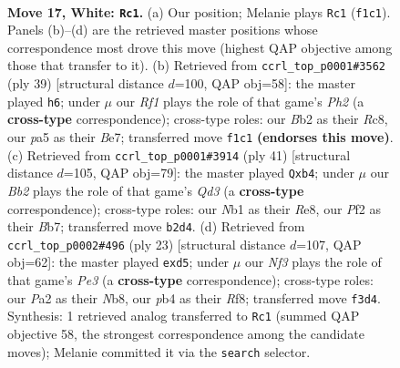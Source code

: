 \documentclass[11pt]{article}
\begin{document}
\clearpage

\begin{figure}[p]\centering
\begin{subfigure}{0.46\textwidth}\centering
\resizebox{\linewidth}{!}{%
\newchessgame
\chessboard[
  setfen={r2q1rk1/4bp2/2n2np1/p6p/1p1p4/1P1P1NP1/PB2QPKP/RN3R2 w - - 2 17},
  showmover=false,
  pgfstyle=straightmove, color=movearrow, markmove={f1-c1}
]}
\caption{}
\end{subfigure}\hfill
\begin{subfigure}{0.46\textwidth}\centering
\resizebox{\linewidth}{!}{%
\newchessgame
\chessboard[
  setfen={r1r3k1/1q2bppp/pp1ppnn1/8/2PNP3/1PN3P1/P2BQP1P/2RR2K1 b - - 4 20},
  showmover=false,
  pgfstyle=straightmove, color=movearrow, markmove={h7-h6}
]}
\caption{}
\end{subfigure}
\\[4pt]
\begin{subfigure}{0.46\textwidth}\centering
\resizebox{\linewidth}{!}{%
\newchessgame
\chessboard[
  setfen={4rr2/1bp3kp/1pnq1ppn/4p3/PP2P3/3P1N1P/1Q2BNP1/R2R2K1 b - - 0 21},
  showmover=false,
  pgfstyle=straightmove, color=movearrow, markmove={d6-b4}
]}
\caption{}
\end{subfigure}\hfill
\begin{subfigure}{0.46\textwidth}\centering
\resizebox{\linewidth}{!}{%
\newchessgame
\chessboard[
  setfen={rn3rk1/pbp1qppp/1p2pn2/3P4/3P4/2NBPN2/PP3PPP/R2Q1RK1 b - - 0 12},
  showmover=false,
  pgfstyle=straightmove, color=movearrow, markmove={e6-d5}
]}
\caption{}
\end{subfigure}
\caption{\textbf{Move 17, White: \texttt{Rc1}.} (a) Our position; Melanie plays \texttt{Rc1} (\texttt{f1c1}). Panels (b)--(d) are the retrieved master positions whose correspondence most drove this move (highest QAP objective among those that transfer to it). (b) Retrieved from \texttt{ccrl\_top\_p0001\#3562} (ply 39) [structural distance $d$=100, QAP obj=58]: the master played \texttt{h6}; under $\mu$ our \emph{Rf1} plays the role of that game's \emph{Ph2} (a \textbf{cross-type} correspondence); cross-type roles: our \emph{B}b2 as their \emph{R}c8, our \emph{p}a5 as their \emph{B}e7; transferred move \texttt{f1c1} \textbf{(endorses this move)}. (c) Retrieved from \texttt{ccrl\_top\_p0001\#3914} (ply 41) [structural distance $d$=105, QAP obj=79]: the master played \texttt{Qxb4}; under $\mu$ our \emph{Bb2} plays the role of that game's \emph{Qd3} (a \textbf{cross-type} correspondence); cross-type roles: our \emph{N}b1 as their \emph{R}e8, our \emph{P}f2 as their \emph{B}b7; transferred move \texttt{b2d4}. (d) Retrieved from \texttt{ccrl\_top\_p0002\#496} (ply 23) [structural distance $d$=107, QAP obj=62]: the master played \texttt{exd5}; under $\mu$ our \emph{Nf3} plays the role of that game's \emph{Pe3} (a \textbf{cross-type} correspondence); cross-type roles: our \emph{P}a2 as their \emph{N}b8, our \emph{p}b4 as their \emph{R}f8; transferred move \texttt{f3d4}. Synthesis: 1 retrieved analog transferred to \texttt{Rc1} (summed QAP objective 58, the strongest correspondence among the candidate moves); Melanie committed it via the \texttt{search} selector.}
\label{fig:thought-m32}
\end{figure}
\end{document}
